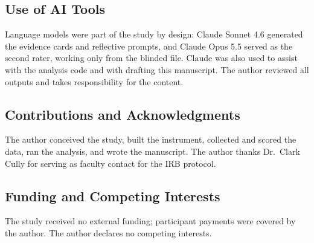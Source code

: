 \documentclass[12pt,letterpaper]{article}
\begin{document}
\subsection{Use of AI Tools}
Language models were part of the study by design: Claude Sonnet 4.6 generated the evidence cards and reflective prompts, and Claude Opus 5.5 served as the second rater, working only from the blinded file. Claude was also used to assist with the analysis code and with drafting this manuscript. The author reviewed all outputs and takes responsibility for the content.

\subsection{Contributions and Acknowledgments}
The author conceived the study, built the instrument, collected and scored the data, ran the analysis, and wrote the manuscript. The author thanks Dr.\ Clark Cully for serving as faculty contact for the IRB protocol.

\subsection{Funding and Competing Interests}
The study received no external funding; participant payments were covered by the author. The author declares no competing interests.
\end{document}
